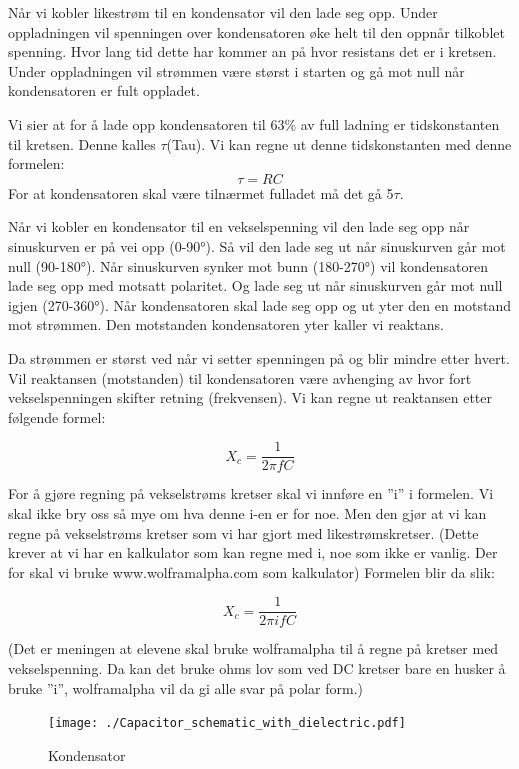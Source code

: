 \documentclass[12pt,a4paper]{article}
\begin{document}
Når vi kobler likestrøm til en kondensator vil den lade seg opp. Under
oppladningen vil spenningen over kondensatoren øke helt til den oppnår
tilkoblet spenning. Hvor lang tid dette har kommer an på hvor resistans
det er i kretsen. Under oppladningen vil strømmen være størst i starten
og gå mot null når kondensatoren er fult oppladet.

Vi sier at for å lade opp kondensatoren til 63\% av full ladning er
tidskonstanten til kretsen. Denne kalles $\tau$(Tau). Vi kan regne
ut denne tidskonstanten med denne formelen:
\[
\tau=RC
\]
 For at kondensatoren skal være tilnærmet fulladet må det gå 5$\tau$. 

Når vi kobler en kondensator til en vekselspenning vil den lade seg
opp når sinuskurven er på vei opp (0-90°). Så vil den lade seg ut
når sinuskurven går mot null (90-180°). Når sinuskurven synker mot
bunn (180-270°) vil kondensatoren lade seg opp med motsatt polaritet.
Og lade seg ut når sinuskurven går mot null igjen (270-360°). Når
kondensatoren skal lade seg opp og ut yter den en motstand mot strømmen.
Den motstanden kondensatoren yter kaller vi reaktans. 

Da strømmen er størst ved når vi setter spenningen på og blir mindre
etter hvert. Vil reaktansen (motstanden) til kondensatoren være avhenging
av hvor fort vekselspenningen skifter retning (frekvensen). Vi kan
regne ut reaktansen etter følgende formel: 

\[
X_{c}=\frac{1}{2\pi fC}
\]

For å gjøre regning på vekselstrøms kretser skal vi innføre en ''i''
i formelen. Vi skal ikke bry oss så mye om hva denne i-en er for noe.
Men den gjør at vi kan regne på vekselstrøms kretser som vi har gjort
med likestrømskretser. (Dette krever at vi har en kalkulator som kan
regne med i, noe som ikke er vanlig. Der for skal vi bruke www.wolframalpha.com
som kalkulator) Formelen blir da slik:

\[
X_{c}=\frac{1}{2\pi ifC}
\]

(Det er meningen at elevene skal bruke wolframalpha til å regne på
kretser med vekselspenning. Da kan det bruke ohms lov som ved DC kretser
bare en husker å bruke ''i'', wolframalpha vil da gi alle svar på
polar form.)

\begin{figure}[H]
\noindent \begin{centering}
\texttt{[image: ./Capacitor\_schematic\_with\_dielectric.pdf]}
\par\end{centering}
\caption{Kondensator}
\end{figure}
\end{document}
